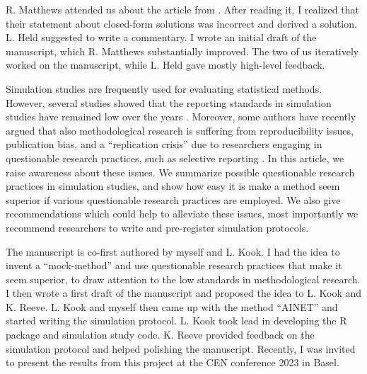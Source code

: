 R. Matthews attended us about the article from \citet{Sondhi2021}. After reading
it, I realized that their statement about closed-form solutions was incorrect
and derived a solution. L. Held suggested to write a commentary. I wrote an
initial draft of the manuscript, which R. Matthews substantially improved. The
two of us iteratively worked on the manuscript, while L. Held gave mostly
high-level feedback.


Simulation studies are frequently used for evaluating statistical methods.
However, several studies showed that the reporting standards in simulation
studies have remained low over the years \citep{Hoaglin1975, Burton2006,
  Morris2019}. Moreover, some authors have recently argued that also
methodological research is suffering from reproducibility issues, publication
bias, and a ``replication crisis'' due to researchers engaging in questionable
research practices, such as selective reporting \citep{Boulesteix2020}. In this
article, we raise awareness about these issues. We summarize possible
questionable research practices in simulation studies, and show how easy it is
make a method seem superior if various questionable research practices are
employed. We also give recommendations which could help to alleviate these
issues, most importantly we recommend researchers to write and pre-register
simulation protocols.

The manuscript is co-first authored by myself and L. Kook. I had the idea to
invent a ``mock-method'' and use questionable research practices that make it
seem superior, to draw attention to the low standards in methodological
research. I then wrote a first draft of the manuscript and proposed the idea to
L. Kook and K. Reeve. L. Kook and myself then came up with the method ``AINET''
and started writing the simulation protocol. L. Kook took lead in developing the
R package and simulation study code. K. Reeve provided feedback on the
simulation protocol and helped polishing the manuscript. Recently, I was invited
to present the results from this project at the CEN conference 2023 in Basel.
